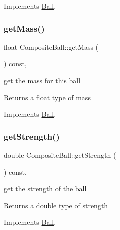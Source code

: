 Implements \mbox{\hyperlink{class_ball_a13794c8d0e0863301a5f321a617542f6}{Ball}}.

\mbox{\label{class_composite_ball_afa621612641fecb3af81390bfbe7d941}} 
\subsubsection{\texorpdfstring{get\+Mass()}{getMass()}}
{\footnotesize\ttfamily float Composite\+Ball\+::get\+Mass (\begin{DoxyParamCaption}{ }\end{DoxyParamCaption}) const\hspace{0.3cm}{\ttfamily [override]}, {\ttfamily [virtual]}}



get the mass for this ball 

\begin{DoxyReturn}{Returns}
a float type of mass 
\end{DoxyReturn}


Implements \mbox{\hyperlink{class_ball_ab755ce741a2f0b652f499d183376be04}{Ball}}.

\mbox{\label{class_composite_ball_a1585c03baf89ce19c58806dfa6eac131}} 
\subsubsection{\texorpdfstring{get\+Strength()}{getStrength()}}
{\footnotesize\ttfamily double Composite\+Ball\+::get\+Strength (\begin{DoxyParamCaption}{ }\end{DoxyParamCaption}) const\hspace{0.3cm}{\ttfamily [override]}, {\ttfamily [virtual]}}



get the strength of the ball 

\begin{DoxyReturn}{Returns}
a double type of strength 
\end{DoxyReturn}


Implements \mbox{\hyperlink{class_ball_ab659c8dceb67abdd09423814d4fc879e}{Ball}}.

